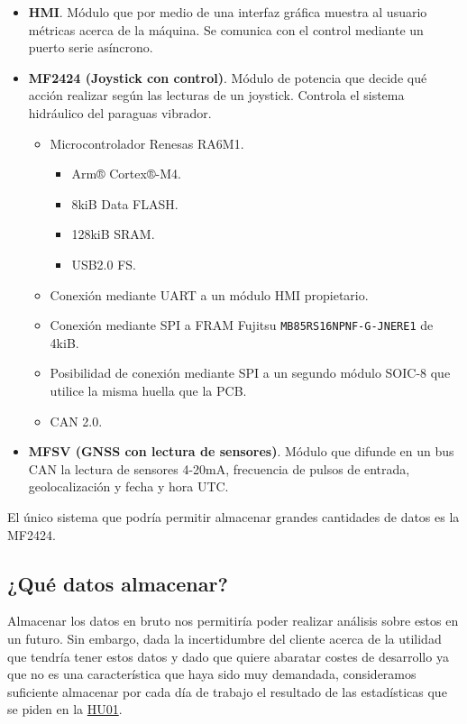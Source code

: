 \begin{itemize}[noitemsep,nolistsep]
    \item \textbf{HMI}. Módulo que por medio de una interfaz gráfica muestra al usuario
          métricas acerca de la máquina. Se comunica con el control mediante un puerto
          serie asíncrono.
    \item \label{sec:joystick_con_control} \textbf{MF2424 (Joystick con control)}. Módulo de potencia que decide qué acción realizar
          según las lecturas de un joystick. Controla el sistema hidráulico del
          paraguas vibrador.
        \begin{itemize}[noitemsep,nolistsep]
            \item Microcontrolador Renesas RA6M1.
            \begin{itemize}[noitemsep,nolistsep]
                \item Arm® Cortex®-M4.
                \item 8kiB Data FLASH.
                \item 128kiB SRAM.
                \item USB2.0 FS.
            \end{itemize}
            \item Conexión mediante UART a un módulo HMI propietario.
            \item Conexión mediante SPI a FRAM Fujitsu \texttt{MB85RS16NPNF-G-JNERE1} de 4kiB.
            \item Posibilidad de conexión mediante SPI a un segundo módulo SOIC-8 que utilice la misma huella que la PCB.
            \item CAN 2.0.
        \end{itemize}
    \item \textbf{MFSV (GNSS con lectura de sensores)}. Módulo que difunde en un bus CAN la
          lectura de sensores 4-20mA, frecuencia de pulsos de entrada,
          geolocalización y fecha y hora UTC.
\end{itemize}

El único sistema que podría permitir almacenar grandes cantidades de datos es la MF2424.

\subsection{¿Qué datos almacenar?}

Almacenar los datos en bruto nos permitiría poder realizar análisis sobre estos en un futuro.
Sin embargo, dada la incertidumbre del cliente acerca de la utilidad que tendría tener estos
datos y dado que quiere abaratar costes de desarrollo ya que no es una característica
que haya sido muy demandada, consideramos suficiente almacenar por cada día de trabajo el
resultado de las estadísticas que se piden en la \hyperref[sec:HU01]{HU01}.

